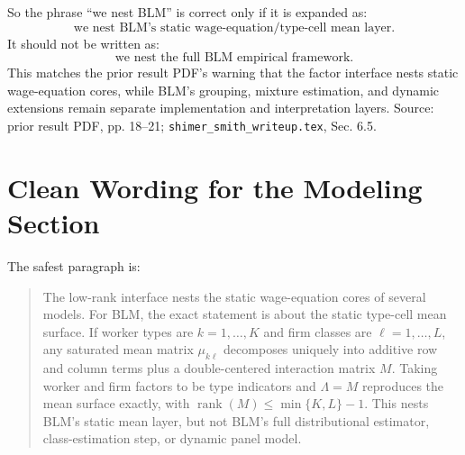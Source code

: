 \documentclass[11pt]{article}
\newcommand{\1}{\mathbf{1}}
\begin{document}
So the phrase ``we nest BLM'' is correct only if it is expanded as:
\[
\text{we nest BLM's static wage-equation/type-cell mean layer.}
\]
It should not be written as:
\[
\text{we nest the full BLM empirical framework.}
\]
This matches the prior result PDF's warning that the factor interface nests
static wage-equation cores, while BLM's grouping, mixture estimation, and dynamic
extensions remain separate implementation and interpretation layers. Source:
prior result PDF, pp. 18--21; \texttt{shimer\_smith\_writeup.tex}, Sec. 6.5.

\section{Clean Wording for the Modeling Section}

The safest paragraph is:

\begin{quote}
The low-rank interface nests the static wage-equation cores of several models.
For BLM, the exact statement is about the static type-cell mean surface. If
worker types are $k=1,\ldots,K$ and firm classes are $\ell=1,\ldots,L$, any
saturated mean matrix $\mu_{k\ell}$ decomposes uniquely into additive row and
column terms plus a double-centered interaction matrix $M$. Taking worker and
firm factors to be type indicators and $\Lambda=M$ reproduces the mean surface
exactly, with $\operatorname{rank}(M)\leq\min\{K,L\}-1$. This nests BLM's static
mean layer, but not BLM's full distributional estimator, class-estimation step,
or dynamic panel model.
\end{quote}
\end{document}
